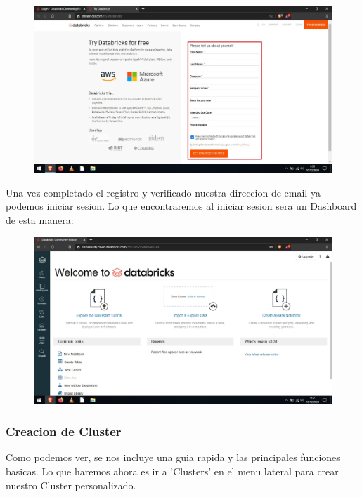 \documentclass[a4paper,10pt]{article}
\begin{document}
\begin{figure}[H]
\begin{center}
\includegraphics[width=500pt]{./fotos/Databricks/2 - Databricks (V).jpg}
\end{center}
\end{figure}

Una vez completado el registro y verificado nuestra direccion de email ya podemos iniciar sesion. Lo que encontraremos al iniciar sesion sera un Dashboard de esta manera:

\begin{figure}[H]
\begin{center}
\includegraphics[width=500pt]{./fotos/Databricks/3 - Databricks.jpg}
\end{center}
\end{figure}

\subsubsection{Creacion de Cluster}

Como podemos ver, se nos incluye una guia rapida y las principales funciones basicas. Lo que haremos ahora es ir a 'Clusters' en el menu lateral para crear nuestro Cluster personalizado.
\end{document}

